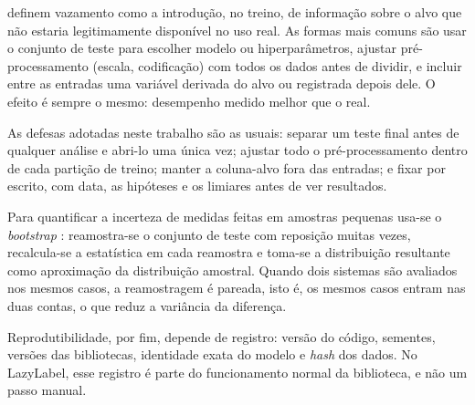  definem vazamento como a introdução, no treino, de informação sobre o alvo que não estaria legitimamente disponível no uso real. As formas mais comuns são usar o conjunto de teste para escolher modelo ou hiperparâmetros, ajustar pré-processamento (escala, codificação) com todos os dados antes de dividir, e incluir entre as entradas uma variável derivada do alvo ou registrada depois dele. O efeito é sempre o mesmo: desempenho medido melhor que o real.

As defesas adotadas neste trabalho são as usuais: separar um teste final antes de qualquer análise e abri-lo uma única vez; ajustar todo o pré-processamento dentro de cada partição de treino; manter a coluna-alvo fora das entradas; e fixar por escrito, com data, as hipóteses e os limiares antes de ver resultados.

Para quantificar a incerteza de medidas feitas em amostras pequenas usa-se o \emph{bootstrap} \cite{efron1993}: reamostra-se o conjunto de teste com reposição muitas vezes, recalcula-se a estatística em cada reamostra e toma-se a distribuição resultante como aproximação da distribuição amostral. Quando dois sistemas são avaliados nos mesmos casos, a reamostragem é pareada, isto é, os mesmos casos entram nas duas contas, o que reduz a variância da diferença.

Reprodutibilidade, por fim, depende de registro: versão do código, sementes, versões das bibliotecas, identidade exata do modelo e \emph{hash} dos dados. No LazyLabel, esse registro é parte do funcionamento normal da biblioteca, e não um passo manual.

